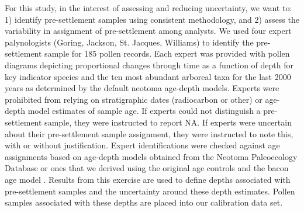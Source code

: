 \documentclass[12pt]{article}
\begin{document}
For this study, in the interest of assessing and reducing uncertainty,
we want to: 1) identify pre-settlement samples using consistent
methodology, and 2) assess the variability in assignment of
pre-settlement among analysts. We used four expert palynologists
(Goring, Jackson, St. Jacques, Williams) to identify the
pre-settlement sample for 185 pollen records. Each expert was provided
with pollen diagrams depicting proportional changes through time as a
function of depth for key indicator species and the ten most abundant
arboreal taxa for the last 2000 years as determined by the default
neotoma age-depth models. Experts were prohibited from relying on
stratigraphic dates (radiocarbon or other) or age-depth model
estimates of sample age. If experts could not distinguish a
pre-settlement sample, they were instructed to report NA. If experts
were uncertain about their pre-settlement sample assignment, they were
instructed to note this, with or without justification. Expert
identifications were checked against age assignments based on
age-depth models obtained from the Neotoma Paleoecology Database or
ones that we derived using the original age controls and the bacon age
model \citep{blaauw2011flexible}.  Results from this exercise are used
to define depths associated with pre-settlement samples and the
uncertainty around these depth estimates. Pollen samples associated
with these depths are placed into our calibration data set.
\end{document}
